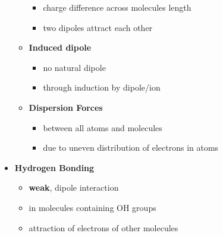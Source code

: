 \documentclass{article}
\theoremstyle{sltheorem}
\begin{document}
\begin{itemize}
\begin{itemize}
\begin{itemize}
            \item charge difference across molecules length
            \item two dipoles attract each other
        \end{itemize}
        \item \textbf{Induced dipole}
        \begin{itemize}
            \item no natural dipole
            \item through induction by dipole/ion
        \end{itemize}
        \item \textbf{Dispersion Forces}
        \begin{itemize}
            \item between all atoms and molecules
            \item due to uneven distribution of electrons in atoms
        \end{itemize}
    \end{itemize}
    \item \textbf{Hydrogen Bonding}
    \begin{itemize}
        \item \textbf{weak}, dipole interaction
        \item in molecules containing OH groups
        \item attraction of electrons of other molecules
    \end{itemize}
\end{itemize}
\end{document}
